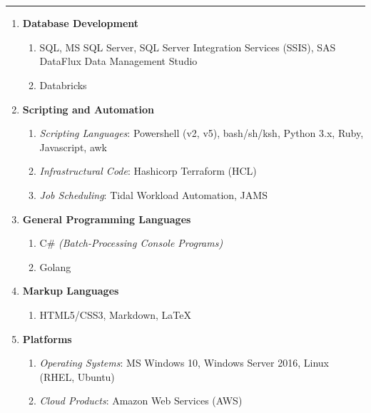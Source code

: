 \documentclass[11pt]{article}
\newcommand{\uppr}[3]{ \noindent\MakeUppercase{{\fontsize{#2}{#3} \selectfont {#1}}} }
\begin{document}
\section*{\uppr{Technical Skills}{14}{16}} \noindent\rule{1.0\textwidth}{0.4pt}
\setlength{\leftmargini}{0pt}
\begin{enumerate}[topsep=0pt, partopsep=0pt, label=\null]

\item \textbf{Database Development}
  \begin{enumerate}[topsep=0pt, partopsep=0pt, label=\null]
  \item SQL, MS SQL Server, SQL Server Integration Services (SSIS), SAS DataFlux Data Management Studio
  \item Databricks
  \end{enumerate}
\item \textbf{Scripting and Automation}
  \begin{enumerate}[topsep=0pt, partopsep=0pt, label=\null]
  \item \textit{Scripting Languages}: Powershell (v2, v5), bash/sh/ksh, Python 3.x, Ruby, Javascript, awk
  \item \textit{Infrastructural Code}: Hashicorp Terraform (HCL)
  \item \textit{Job Scheduling}: Tidal Workload Automation, JAMS
  \end{enumerate}
\item \textbf{General Programming Languages}
  \begin{enumerate}[topsep=0pt, partopsep=0pt, label=\null]
  \item C\# \textit{(Batch-Processing Console Programs)}
  \item Golang
  \end{enumerate}
\item \textbf{Markup Languages}
  \begin{enumerate}[topsep=0pt, partopsep=0pt, label=\null]
  \item HTML5/CSS3, Markdown, {\LaTeX}
  \end{enumerate}
\item \textbf{Platforms}
  \begin{enumerate}[topsep=0pt, partopsep=0pt, label=\null]
  \item \textit{Operating Systems}: MS Windows 10, Windows Server 2016, Linux (RHEL, Ubuntu)
  \item \textit{Cloud Products}: Amazon Web Services (AWS)

\end{enumerate}
\end{enumerate}
\end{document}
